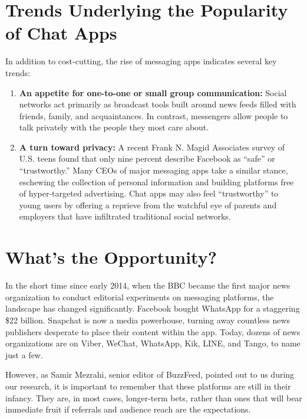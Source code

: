 \documentclass[notoc, symmetric, nobib, nols]{towcenter-guideto-book}
\begin{document}
\section{Trends Underlying the Popularity of Chat Apps}

In addition to cost-cutting, the rise of messaging apps indicates several key trends:

\begin{enumerate}[itemsep=1em]
\item\textbf{An appetite for one-to-one or small group communication:} Social networks act primarily as broadcast tools built around news feeds filled with friends, family, and acquaintances. In contrast, messengers allow people to talk privately with the people they most care about. 

\item\textbf{A turn toward privacy:} A recent Frank N. Magid Associates survey of U.S. teens found that only nine percent describe Facebook as ``safe'' or ``trustworthy.''\autocite{MagidStudy} Many CEOs of major messaging apps take a similar stance, eschewing the collection of personal information and building platforms free of hyper-targeted advertising. Chat apps may also feel ``trustworthy'' to young users by offering a reprieve from the watchful eye of parents and employers that have infiltrated traditional social networks.
\end{enumerate}
 
\section{What's the Opportunity?}

In the short time since early 2014, when the BBC became the first major news organization to conduct editorial experiments on messaging platforms, the landscape has changed significantly. Facebook bought WhatsApp for a staggering \$22 billion. Snapchat is now a media powerhouse, turning away countless news publishers desperate to place their content within the app. Today, dozens of news organizations are on Viber, WeChat, WhatsApp, Kik, LINE, and Tango, to name just a few.

However, as Samir Mezrahi, senior editor of BuzzFeed, pointed out to us during our research, it is important to remember that these platforms are still in their infancy. They are, in most cases, longer-term bets, rather than ones that will bear immediate fruit if referrals and audience reach are the expectations. 
\end{document}
